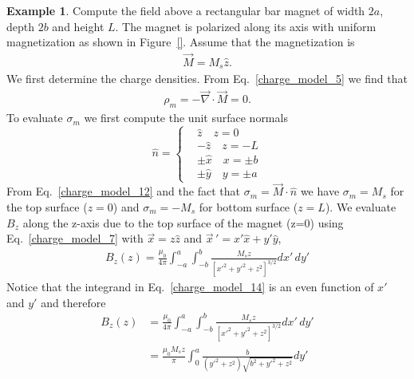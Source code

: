 \documentclass[11pt,a4paper,oneside]{book}
\numberwithin{equation}{section}
\theoremstyle{it}
\theoremstyle{definition}
\newtheorem{example}{Example}[section]
\begin{document}
\begin{example}
	Compute the field above a rectangular bar magnet of width $2a$, depth $2b$ and height $L$. The magnet is polarized along its axis with uniform magnetization as shown in Figure~\ref{}. Assume that the magnetization is 
	\begin{equation}\label{charge_model_12}
		{\begin{aligned}
				\vec{M} = M_s\hat{z}.
		\end{aligned}}
	\end{equation} 
We first determine the charge densities. From Eq.~\eqref{charge_model_5} we find that
\begin{equation}\label{charge_model_13}
{\begin{aligned}
		\rho_m = -\vec{\nabla}\cdot\vec{M}=0.
\end{aligned}}
\end{equation} 
To evaluate $\sigma_m$ we first compute the unit surface normals
\begin{equation*}\label{}
\hat{n} = \left\lbrace 
	\begin{aligned}
		&\hat{z}\quad z=0 \\[6pt]	
		&-\hat{z}\quad z=-L \\[6pt]
		&\pm\hat{x}\quad x=\pm b \\[6pt]	
		&\pm\hat{y}\quad y=\pm a  
	\end{aligned}\right. 
\end{equation*} 
From Eq.~\eqref{charge_model_12} and the fact that $\sigma_m=\vec{M}\cdot\hat{n}$ we have $\sigma_m=M_s$ for the top surface ($z=0$) and $\sigma_m=-M_s$ for bottom surface ($z=L$). We evaluate $B_z$ along the z-axis due to the top surface of the magnet (z=0) using Eq.~\eqref{charge_model_7} with $\vec{x}=z\hat{z}$ and $\vec{x}\,'=x'\hat{x}+y'\hat{y}$,
\begin{equation}\label{charge_model_14}
	\begin{aligned}
			B_z(z) = \frac{\mu_0}{4\pi}\int_{-a}^{a}\int_{-b}^{b}\frac{M_s z}{[{x'}^2+{y'}^2+{z}^2]^{3/2}}dx'\,dy'
	\end{aligned}
\end{equation} 
Notice that the integrand in Eq.~\eqref{charge_model_14} is an even function of $x'$ and $y'$ and therefore
\begin{equation*}\label{}
	\begin{aligned}
		B_z(z) &= \frac{\mu_0}{4\pi}\int_{-a}^{a}\int_{-b}^{b}\frac{M_s z}{[{x'}^2+{y'}^2+{z}^2]^{3/2}}dx'\,dy' \\[6pt]
		&=\frac{\mu_0M_s z}{\pi}\int_{0}^{a}\frac{b}{({y'}^2+{z}^2)\sqrt{b^2+{y'}^2+z^2}}dy' \\[6pt]

\end{aligned}
\end{equation*}
\end{example}
\end{document}

